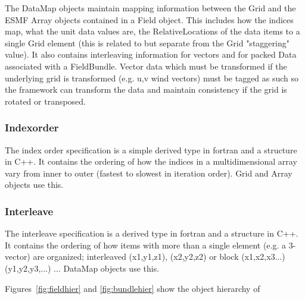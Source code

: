 The DataMap objects maintain mapping information between the
Grid and the ESMF Array objects contained in a Field object.
This includes how the indices map, what the unit data values are,
the RelativeLocations of the data items to a single Grid element
(this is related to but separate from the Grid "staggering" value).
It also contains interleaving information for vectors and for
packed Data associated with a FieldBundle.
Vector data which must be transformed if the underlying grid
is transformed (e.g. u,v wind vectors) must be tagged as such
so the framework can transform the data and maintain consistency
if the grid is rotated or transposed.

\subsubsection{Indexorder}

The index order specification is 
a simple derived type in fortran and a structure in C++.
It contains the ordering of how the indices in a multidimensional
array vary from inner to outer (fastest to slowest in iteration
order).  Grid and Array objects use this.

\subsubsection{Interleave}

The interleave specification is a 
derived type in fortran and a structure in C++.
It contains the ordering of how items with more than
a single element (e.g. a 3-vector) are organized; 
interleaved (x1,y1,z1), (x2,y2,z2) or 
block (x1,x2,x3...) (y1,y2,y3,...) ...
DataMap objects use this.


Figures~\ref{fig:fieldhier} and \ref{fig:bundlehier} show the object hierarchy of

